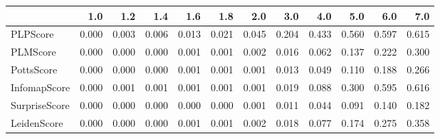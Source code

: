 \begin{tabular}{lrrrrrrrrrrr}
\toprule
{} &   1.0 &   1.2 &   1.4 &   1.6 &   1.8 &   2.0 &   3.0 &   4.0 &   5.0 &   6.0 &   7.0 \\
\midrule
PLPScore      & 0.000 & 0.003 & 0.006 & 0.013 & 0.021 & 0.045 & 0.204 & 0.433 & 0.560 & 0.597 & 0.615 \\
PLMScore      & 0.000 & 0.000 & 0.000 & 0.001 & 0.001 & 0.002 & 0.016 & 0.062 & 0.137 & 0.222 & 0.300 \\
PottsScore    & 0.000 & 0.000 & 0.000 & 0.001 & 0.001 & 0.001 & 0.013 & 0.049 & 0.110 & 0.188 & 0.266 \\
InfomapScore  & 0.000 & 0.001 & 0.001 & 0.001 & 0.001 & 0.001 & 0.019 & 0.088 & 0.300 & 0.595 & 0.616 \\
SurpriseScore & 0.000 & 0.000 & 0.000 & 0.000 & 0.000 & 0.001 & 0.011 & 0.044 & 0.091 & 0.140 & 0.182 \\
LeidenScore   & 0.000 & 0.000 & 0.000 & 0.001 & 0.001 & 0.002 & 0.018 & 0.077 & 0.174 & 0.275 & 0.358 \\
\bottomrule
\end{tabular}

